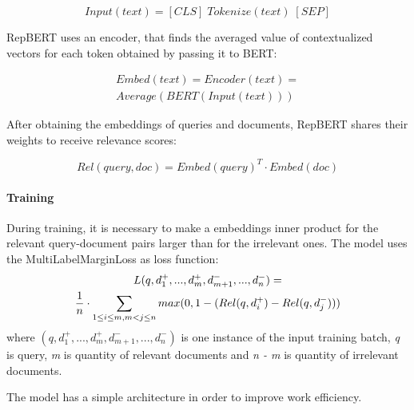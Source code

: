 \documentclass[
    twocolumn,
]{ceurart}
\begin{document}
    \begin{equation}
        Input(text) = [CLS]\;Tokenize(text)\;[SEP]
    \end{equation}

    RepBERT uses an encoder, that finds the averaged value of contextualized vectors for each token
    obtained by passing it to BERT:

    \begin{multline}
        Embed(text)=Encoder(text)=\\
        Average(BERT(Input(text)))
    \end{multline}

    After obtaining the embeddings of queries and documents, RepBERT shares their weights
    to receive relevance scores:

    \begin{equation}
        Rel(query,doc) = Embed(query)^T \cdot Embed(doc)
    \end{equation}

    \paragraph{Training}
    During training, it is necessary to make a embeddings inner product for the relevant
    query-document pairs larger than for the irrelevant ones.
    The model uses the MultiLabelMarginLoss as loss function:
    \begin{multline}
        \mathnormal{L}(q,d_1^+,...,d_m^+,d_{m+1}^-,...,d_n^-) = \\
        \frac{1}{n} \cdot \sum_{1 \leq i \leq m,m < j \leq n}
        max(0, 1 - (Rel(q,d_i^+) - Rel(q,d_j^-)))
    \end{multline}
    where $(q,d_1^+,...,d_m^+,d_{m+1}^-,...,d_n^-)$ is one instance of the input training batch,
    \emph{q} is query, \emph{m} is quantity of relevant documents and \emph{n - m} is quantity
    of irrelevant documents\cite{RepBERT}.\\\par
    The model has a simple architecture in order to improve work efficiency.

\end{document}
